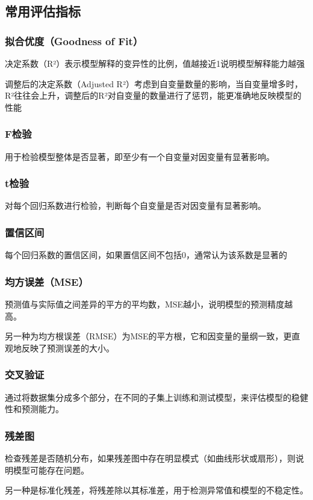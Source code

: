 \documentclass[10pt]{article}
\begin{document}
	\subsection{常用评估指标}
	\subsubsection{拟合优度（Goodness of Fit）}
	决定系数（R²）表示模型解释的变异性的比例，值越接近1说明模型解释能力越强\par
	调整后的决定系数（Adjusted R²）考虑到自变量数量的影响，当自变量增多时，R²往往会上升，调整后的R²对自变量的数量进行了惩罚，能更准确地反映模型的性能\par
	\subsubsection{F检验}
	用于检验模型整体是否显著，即至少有一个自变量对因变量有显著影响。
	\subsubsection{t检验}
	对每个回归系数进行检验，判断每个自变量是否对因变量有显著影响。
	\subsubsection{置信区间}
	每个回归系数的置信区间，如果置信区间不包括0，通常认为该系数是显著的
	\subsubsection{均方误差（MSE）}
	预测值与实际值之间差异的平方的平均数，MSE越小，说明模型的预测精度越高。\par
	另一种为均方根误差（RMSE）为MSE的平方根，它和因变量的量纲一致，更直观地反映了预测误差的大小。
	\subsubsection{交叉验证}通过将数据集分成多个部分，在不同的子集上训练和测试模型，来评估模型的稳健性和预测能力。
	\subsubsection{残差图}检查残差是否随机分布，如果残差图中存在明显模式（如曲线形状或扇形），则说明模型可能存在问题。\par
	另一种是标准化残差，将残差除以其标准差，用于检测异常值和模型的不稳定性。
	
	
	
\end{document}
